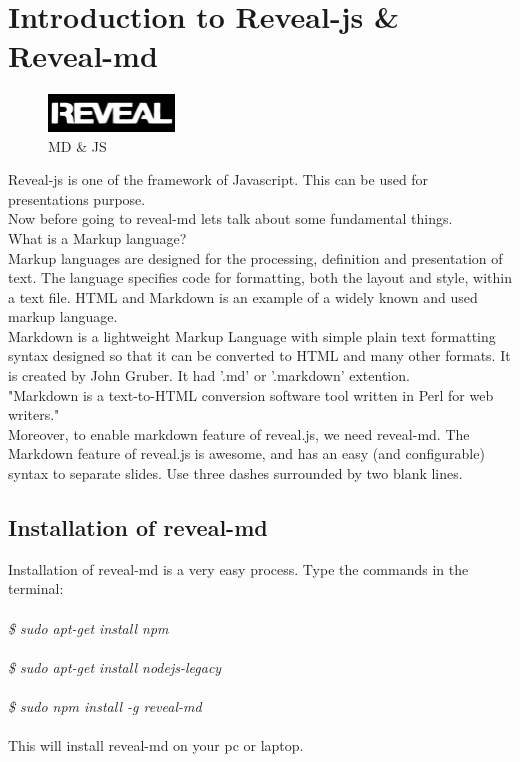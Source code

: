 \section{Introduction to Reveal-js \& Reveal-md}
\begin{figure}[!ht]
\centering
\includegraphics[width=0.3\textwidth]{input/images/rd.jpg}                   
\caption{MD \& JS}
\hspace{-1.5em}
\end{figure}
Reveal-js is one of the framework of Javascript. This can be used for presentations purpose.\\
Now before going to reveal-md lets talk about some fundamental things.\\
What is a Markup language?\\
Markup languages are designed for the processing, definition and presentation of text. The language specifies code for formatting, both the layout and style, within a text file. HTML and Markdown  is an example of a widely known and used markup language.\\
Markdown is a lightweight Markup Language with simple plain text formatting syntax designed so that it can be converted to HTML and many other formats. It is created by  John Gruber. It had '.md' or '.markdown' extention.\\
"Markdown is a text-to-HTML conversion software tool written in Perl for web writers."\\
Moreover, to enable markdown feature of reveal.js, we need reveal-md. The Markdown feature of reveal.js is awesome, and has an easy (and configurable) syntax to separate slides. Use three dashes surrounded by two blank lines.\\
\subsection{Installation of reveal-md}
Installation of reveal-md is a very easy process.
Type the commands in the terminal:\\\\
\emph{
\$ sudo apt-get install npm\\\\
\$ sudo apt-get install nodejs-legacy\\\\
\$ sudo npm install -g reveal-md\\\\}
This will install reveal-md on your pc or laptop.


